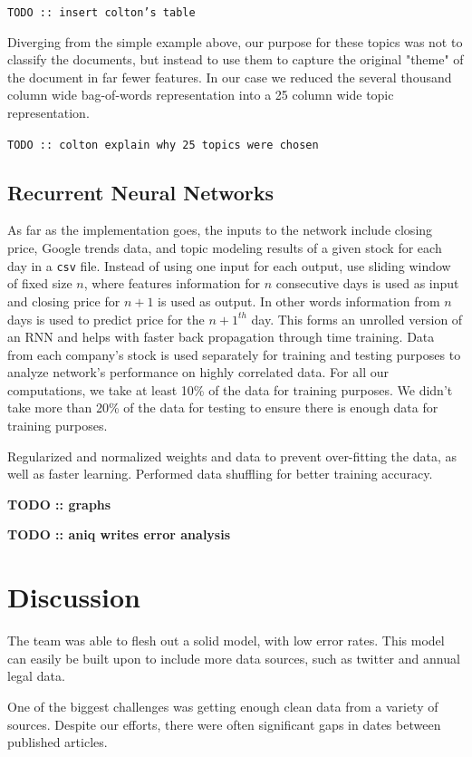 \documentclass{article}
\begin{document}
\texttt{TODO :: insert colton's table}

Diverging from the simple example above, our purpose for these topics was not to classify the documents, but instead to use them to capture the original "theme" of the document in far fewer features. In our case we reduced the several thousand column wide bag-of-words representation into a 25 column wide topic representation. 

\texttt{TODO :: colton explain why 25 topics were chosen}

\subsection{Recurrent Neural Networks}

As far as the implementation goes, the inputs to the network include closing price, Google trends data, and topic modeling results of a given stock for each day in a \texttt{csv} file. Instead of using one input for each output, use sliding window of fixed size $n$, where features information for $n$ consecutive days is used as input and closing price for $n+1$ is used as output. In other words information from $n$ days is used to predict price for the $n+1^{th}$ day. This forms an unrolled version of an RNN and helps with faster back propagation through time training. Data from each company’s stock is used separately for training and testing purposes to analyze network’s performance on highly correlated data. For all our computations, we take at least 10\% of the data for training purposes. We didn’t take more than 20\% of the data for testing to ensure there is enough data for training purposes.

Regularized and normalized weights and data to prevent over-fitting the data, as well as faster learning. Performed data shuffling for better training accuracy.

\textbf{TODO :: graphs}

\textbf{TODO :: aniq writes error analysis}

\section{Discussion}

The team was able to flesh out a solid model, with low error rates. This model can easily be built upon to include more data sources, such as twitter and annual legal data. 

One of the biggest challenges was getting enough clean data from a variety of sources. Despite our efforts, there were often significant gaps in dates between published articles.
\end{document}
